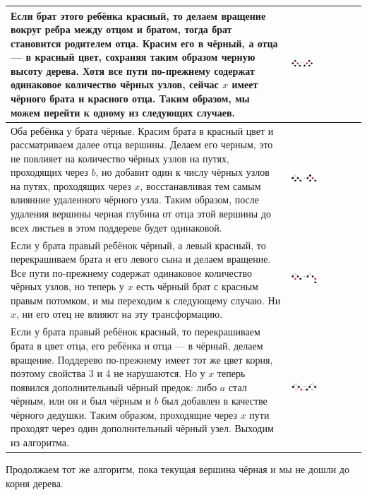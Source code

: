 \begin{table}[hbtp!]
\centering
\begin{tabular}{|m{10cm}|m{7cm}|}
\hline
Если брат этого ребёнка красный, то делаем вращение вокруг ребра между отцом и братом, тогда брат становится родителем отца. Красим его в чёрный, а отца — в красный цвет, сохраняя таким образом черную высоту дерева.
Хотя все пути по-прежнему содержат одинаковое количество чёрных узлов, сейчас $x$ имеет чёрного брата и красного отца.
Таким образом, мы можем перейти к одному из следующих случаев.
& \includegraphics[width=0.35\textwidth]{img/3_3.png} \\ \hline
Оба ребёнка у брата чёрные.
Красим брата в красный цвет и рассматриваем далее отца вершины.
Делаем его черным, это не повлияет на количество чёрных узлов на путях, проходящих через $b$, но добавит один к числу чёрных узлов на путях, проходящих через $x$, восстанавливая тем самым влиянние удаленного чёрного узла.
Таким образом, после удаления вершины черная глубина от отца этой вершины до всех листьев в этом поддереве будет одинаковой. 
& \includegraphics[width=0.4\textwidth]{img/3_4.png} \\ \hline
Если у брата правый ребёнок чёрный, а левый красный, то перекрашиваем брата и его левого сына и делаем вращение.
Все пути по-прежнему содержат одинаковое количество чёрных узлов, но теперь у $x$ есть чёрный брат с красным правым потомком, и мы переходим к следующему случаю.
Ни $x$, ни его отец не влияют на эту трансформацию.
& \includegraphics[width=0.4\textwidth]{img/3_5.png} \\ \hline
Если у брата правый ребёнок красный, то перекрашиваем брата в цвет отца, его ребёнка и отца — в чёрный, делаем вращение.
Поддерево по-прежнему имеет тот же цвет корня, поэтому свойства 3 и 4 не нарушаются.
Но у $x$ теперь появился дополнительный чёрный предок: либо $a$ стал чёрным, или он и был чёрным и $b$ был добавлен в качестве чёрного дедушки.
Таким образом, проходящие через $x$ пути проходят через один дополнительный чёрный узел.
Выходим из алгоритма. 
& \includegraphics[width=0.4\textwidth]{img/3_6.png} \\ \hline

\end{tabular}
\end{table}

Продолжаем тот же алгоритм, пока текущая вершина чёрная и мы не дошли до корня дерева.
